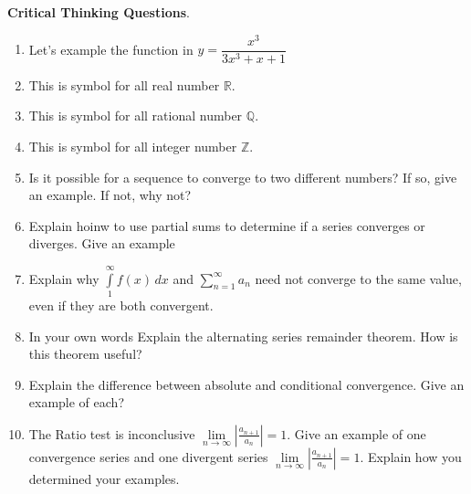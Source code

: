\documentclass[11pt, letterpaper]{article}
\def\eq1{y=\dfrac{x^3}{3x^3+x+1}}
\newcommand{\set}[1]{\setlength\itemsep{#1em}}
\begin{document}
    \textbf{Critical Thinking Questions}.
    \begin{enumerate}
        \set{1.2}
        \item Let's example the function in $\eq1$
        \item This is symbol for all real number $\mathbb{R}.$
        \item This is symbol for all rational number $\mathbb{Q}.$
        \item This is symbol for all integer number $\mathbb{Z}.$        
        \item Is it possible for a sequence to converge to two different numbers? If so, give an example. If not, why not?
        \item Explain hoinw to use partial sums to determine if a series converges or diverges. Give an example
        \item Explain why $\int\limits_{1}^{\infty} f(x)\,dx$ and $\sum\limits_{n=1}^{\infty} a_n$ need not converge to the same value, even if they are both convergent.
        \item In your own words Explain the alternating series remainder theorem. How is this theorem useful?
        \item Explain the difference between absolute and conditional convergence. Give an example of each?
        \item The Ratio test is inconclusive $ \displaystyle{\lim\limits_{n \to \infty} \left | \frac{a_{n+1}}{a_n}\right | =1}$. Give an example of one convergence series and one divergent series $\displaystyle{\lim\limits_{n \to \infty} \left | \frac{a_{n+1}}{a_n}\right | =1}$. Explain how you determined your examples.
        
    \end{enumerate}
    
\end{document}
